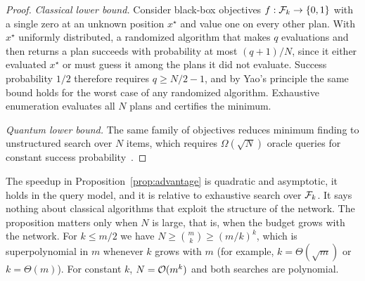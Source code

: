 \begin{proof}
\emph{Classical lower bound.} Consider black-box objectives $f:\mathcal{F}_k\to\{0,1\}$ with a single zero at an unknown position $x^\star$ and value one on every other plan. With $x^\star$ uniformly distributed, a randomized algorithm that makes $q$ evaluations and then returns a plan succeeds with probability at most $(q+1)/N$, since it either evaluated $x^\star$ or must guess it among the plans it did not evaluate. Success probability $1/2$ therefore requires $q\ge N/2-1$, and by Yao's principle the same bound holds for the worst case of any randomized algorithm. Exhaustive enumeration evaluates all $N$ plans and certifies the minimum.

\emph{Quantum lower bound.} The same family of objectives reduces minimum finding to unstructured search over $N$ items, which requires $\Omega(\sqrt{N})$ oracle queries for constant success probability~\cite{bbbv1997,zalka1999}.
\end{proof}

\begin{remark}
The speedup in Proposition~\ref{prop:advantage} is quadratic and asymptotic, it holds in the query model, and it is relative to exhaustive search over $\mathcal{F}_k$. It says nothing about classical algorithms that exploit the structure of the network. The proposition matters only when $N$ is large, that is, when the budget grows with the network. For $k\le m/2$ we have $N\ge\binom{m}{k}\ge(m/k)^k$, which is superpolynomial in $m$ whenever $k$ grows with $m$ (for example, $k=\Theta(\sqrt{m})$ or $k=\Theta(m)$). For constant $k$, $N=\mathcal{O}(m^k)$ and both searches are polynomial.
\end{remark}

